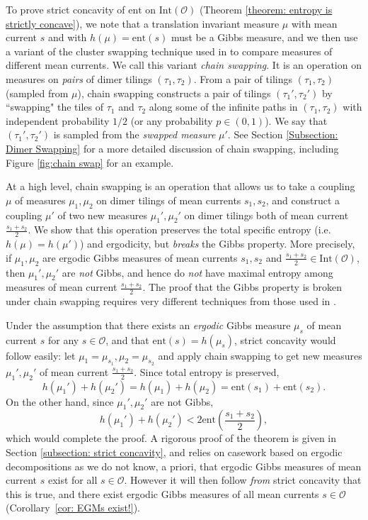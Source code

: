 \documentclass[11pt]{article}
\theoremstyle{remark}
\theoremstyle{definition}
\newcommand{\ent}{\text{ent}}
\newcommand{\mc}[1]{\mathcal{#1}}
\begin{document}
To prove strict concavity of $\ent$ on $\text{Int}(\mc O)$ (Theorem \ref{theorem: entropy is strictly concave}), we note that a translation invariant measure $\mu$ with mean current $s$ and with $h(\mu) = \ent(s)$ must be a Gibbs measure, and we then use a variant of the cluster swapping technique used in \cite{AST_2005__304__R1_0} to compare measures of different mean currents. We call this variant \textit{chain swapping}. It is an operation on measures on \textit{pairs} of dimer tilings $(\tau_1,\tau_2)$. From a pair of tilings $(\tau_1,\tau_2)$ (sampled from $\mu$), chain swapping constructs a pair of tilings $(\tau_1',\tau_2')$ by ``swapping" the tiles of $\tau_1$ and $\tau_2$ along some of the infinite paths in $(\tau_1,\tau_2)$ with independent probability $1/2$ (or any probability $p\in (0,1)$). We say that $(\tau_1',\tau_2')$ is sampled from the \textit{swapped measure} $\mu'$. See Section \ref{Subsection: Dimer Swapping} for a more detailed discussion of chain swapping, including Figure \ref{fig:chain swap} for an example.

At a high level, chain swapping is an operation that allows us to take a coupling $\mu$ of measures $\mu_1,\mu_2$ on dimer tilings of mean currents $s_1,s_2$, and construct a coupling $\mu'$ of two new measures $\mu_1',\mu_2'$ on dimer tilings both of mean current $\frac{s_1+s_2}{2}$. We show that this operation preserves the total specific entropy (i.e. $h(\mu) = h(\mu')$) and ergodicity, but \textit{breaks} the Gibbs property. More precisely, if $\mu_1, \mu_2$ are ergodic Gibbs measures of mean currents $s_1,s_2$ and $\frac{s_1+s_2}{2}\in \text{Int}(\mc O)$, then $\mu_1',\mu_2'$ are \textit{not} Gibbs, and hence do \textit{not} have maximal entropy among measures of mean current $\frac{s_1+s_2}{2}$. The proof that the Gibbs property is broken under chain swapping requires very different techniques from those used in \cite{AST_2005__304__R1_0}. 

Under the assumption that there exists an \textit{ergodic} Gibbs measure $\mu_s$ of mean current $s$ for any $s\in \mc O$, and that $\ent(s)=h(\mu_s)$, strict concavity would follow easily: let $\mu_1 = \mu_{s_1}, \mu_2=\mu_{s_2}$ and apply chain swapping to get new measures $\mu_1',\mu_2'$ of mean current $\frac{s_1+s_2}{2}$. Since total entropy is preserved,
$$h(\mu_1') + h(\mu_2') = h(\mu_1)+h(\mu_2)=\ent(s_1)+\ent(s_2).$$
On the other hand, since $\mu_1',\mu_2'$ are not Gibbs, $$h(\mu_1')+h(\mu_2') < 2\ent(\frac{s_1+s_2}{2}),$$
which would complete the proof. A rigorous proof of the theorem is given in Section \ref{subsection: strict concavity}, and relies on casework based on ergodic decompositions as we do not know, a priori, that ergodic Gibbs measures of mean current $s$ exist for all $s\in \mc O$. However it will then follow \textit{from} strict concavity that this is true, and there exist ergodic Gibbs measures of all mean currents $s\in \mc O$ (Corollary~\ref{cor: EGMs exist!}).
\end{document}
